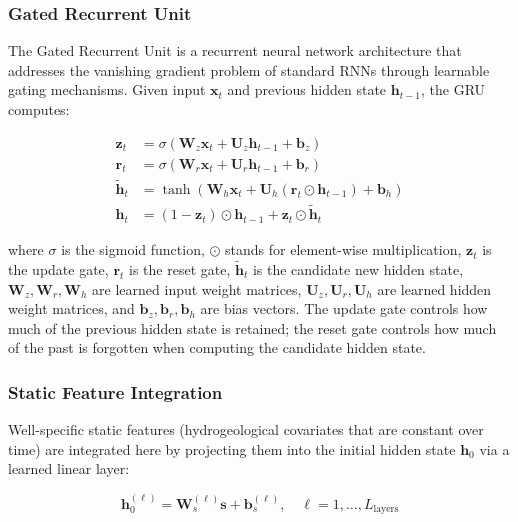 \subsubsection{Gated Recurrent Unit}

The Gated Recurrent Unit \citep{cho2014learning} is a recurrent neural network architecture
that addresses the vanishing gradient problem of standard RNNs through learnable gating
mechanisms. Given input $\mathbf{x}_t$ and previous hidden state $\mathbf{h}_{t-1}$, the GRU
computes:

\begin{align}
  \mathbf{z}_t &= \sigma\!\left(\mathbf{W}_z \mathbf{x}_t + \mathbf{U}_z \mathbf{h}_{t-1} + \mathbf{b}_z\right) \label{eq:gru_update}\\
  \mathbf{r}_t &= \sigma\!\left(\mathbf{W}_r \mathbf{x}_t + \mathbf{U}_r \mathbf{h}_{t-1} + \mathbf{b}_r\right) \label{eq:gru_reset}\\
  \tilde{\mathbf{h}}_t &= \tanh\!\left(\mathbf{W}_h \mathbf{x}_t + \mathbf{U}_h (\mathbf{r}_t \odot \mathbf{h}_{t-1}) + \mathbf{b}_h\right) \label{eq:gru_candidate}\\
  \mathbf{h}_t &= (1 - \mathbf{z}_t) \odot \mathbf{h}_{t-1} + \mathbf{z}_t \odot \tilde{\mathbf{h}}_t \label{eq:gru_hidden}
\end{align}

where $\sigma$ is the sigmoid function, $\odot$ stands for element-wise multiplication,
$\mathbf{z}_t$ is the update gate, $\mathbf{r}_t$ is the reset gate, $\tilde{\mathbf{h}}_t$
is the candidate new hidden state, $\mathbf{W}_z, \mathbf{W}_r, \mathbf{W}_h$ are learned input
weight matrices, $\mathbf{U}_z, \mathbf{U}_r, \mathbf{U}_h$ are learned hidden weight
matrices, and $\mathbf{b}_z, \mathbf{b}_r, \mathbf{b}_h$ are bias vectors. The update gate
controls how much of the previous hidden state is retained; the reset gate controls how much
of the past is forgotten when computing the candidate hidden state.

\subsubsection{Static Feature Integration}

Well-specific static features (hydrogeological covariates that are constant over time) are
integrated here by projecting them into the initial hidden state $\mathbf{h}_0$ via a learned
linear layer:

\begin{equation}
  \mathbf{h}_0^{(\ell)} = \mathbf{W}_s^{(\ell)} \mathbf{s} + \mathbf{b}_s^{(\ell)}, \quad \ell = 1, \ldots, L_\text{layers}
  \label{eq:static_init}
\end{equation}

